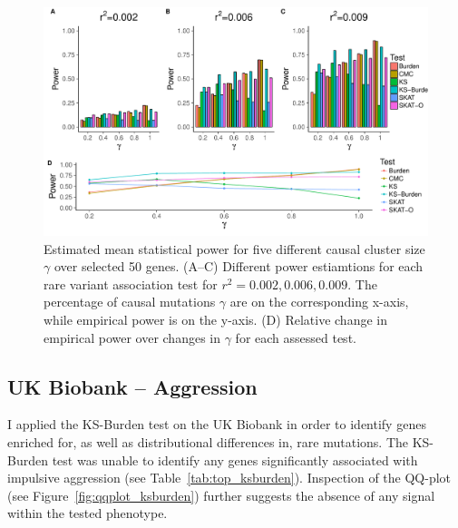\begin{figure}[ht!]
  \centering
  \includegraphics[width=1.0\linewidth]{ksburden/figures/combined_power_analysis.pdf}
  \caption[Estimated mean statistical power]{Estimated mean statistical power for five different causal cluster size $\gamma$ over selected 50 genes.
    (A--C) Different power estiamtions for each rare variant association test for $r^2=0.002, 0.006, 0.009$.
    The percentage of causal mutations $\gamma$ are on the corresponding x-axis, while empirical power is on the y-axis.
    (D) Relative change in empirical power over changes in $\gamma$ for each assessed test.\label{fig:simulatedGeneRealData}}
\end{figure}


\subsection{UK Biobank -- Aggression}
\label{sub:ukbiobank_aggression}

I applied the KS-Burden test on the UK Biobank in order to identify genes enriched for, as well as distributional differences in, rare mutations. 
The KS-Burden test was unable to identify any genes significantly associated with impulsive aggression (see Table~\ref{tab:top_ksburden}).
Inspection of the QQ-plot (see Figure~\ref{fig:qqplot_ksburden}) further suggests the absence of any signal within the tested phenotype.

